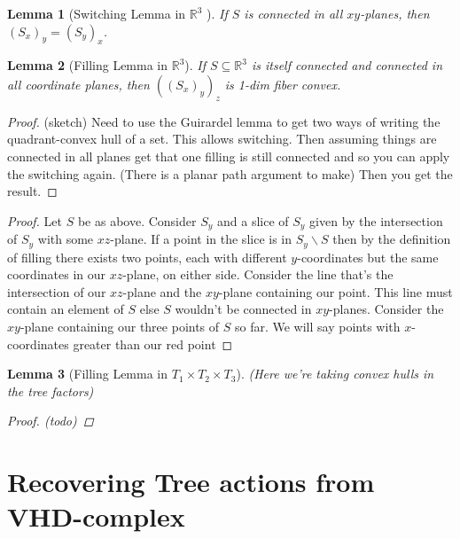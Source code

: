 \documentclass{article}
\newcommand{\sxyz}{((S_x)_y)_z}
\theoremstyle{mystyle}
\newtheorem{lem}{Lemma}[section]
\theoremstyle{remark}
\begin{document}
\begin{lem}
	[Switching Lemma in \(\mathbb{R}^{3}\) ]
	 \label{lem:switch} 
	 If \(S\) is connected in all \(xy\)-planes, then \((S_{x})_{y} = (S_{y})_{x}\).
	
\end{lem}
\begin{lem}
    [Filling Lemma in \(\mathbb{R}^{3}\)]
	\label{lem:fillr3}
	If \(S \subseteq \mathbb{R}^{3}\) is itself connected and connected in all coordinate planes, then \(\sxyz\) is 1-dim fiber convex.
\end{lem}
\begin{proof}
    (sketch) Need to use the Guirardel lemma to get two ways of writing the quadrant-convex hull of a set. This allows switching. Then assuming things are connected in all planes get that one filling is still connected and so you can apply the switching again. (There is a planar path argument to make) Then you get the result.
\end{proof}
\begin{proof}
	Let \(S\) be as above. Consider \(S_{ y}\) and a slice of \(S_{ y}\) given by the intersection of \(S_{ y}\) with some \(xz\)-plane. If a point in the slice is in \(S_{y} \smallsetminus   S\) then by the definition of filling there exists two points, each with different \(y\)-coordinates but the same coordinates in our \(xz\)-plane, on either side. Consider the line that's the intersection of our \(xz\)-plane and the \(xy\)-plane containing our point. This line must contain an element of \(S\) else \(S\) wouldn't be connected in \(xy\)-planes. Consider the \(xy\)-plane containing our three points of \(S\) so far. We will say points with \(x\)-coordinates greater than our red point 
\end{proof}
\begin{lem}
    [Filling Lemma in \(T_{1} \times T_{2} \times T_{3}\)]
	\label{lem:fillt3}
    (Here we're taking convex hulls in the tree factors)
\begin{proof}
    (todo)
\end{proof}
\end{lem}


\section{Recovering Tree actions from VHD-complex}
\end{document}
